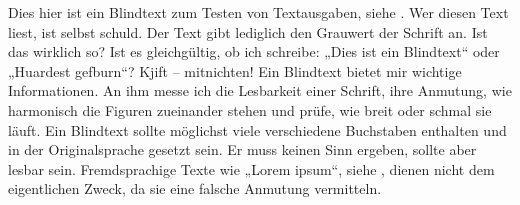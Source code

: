 \documentclass[12pt,ngerman]{scrartcl}
\begin{document}
\blindtext

Dies hier ist ein Blindtext zum Testen von Textausgaben, siehe \cite{Ziegenhagen2023}. Wer diesen Text liest, ist selbst schuld. Der Text gibt lediglich den Grauwert der Schrift an. Ist das wirklich so? Ist es gleichgültig, ob ich schreibe: „Dies ist ein Blindtext“ oder „Huardest gefburn“? Kjift – mitnichten! Ein \cite{Knuth1982} Blindtext bietet mir wichtige Informationen. An ihm messe ich die Lesbarkeit einer Schrift, ihre Anmutung, wie harmonisch die Figuren zueinander stehen und prüfe, wie breit oder schmal sie läuft. Ein Blindtext sollte möglichst viele verschiedene Buchstaben enthalten und in der Originalsprache gesetzt sein. Er muss keinen Sinn ergeben, sollte aber lesbar sein. Fremdsprachige Texte wie „Lorem ipsum“, siehe \cite{Knuth1982}, dienen nicht dem eigentlichen Zweck, da sie eine falsche Anmutung vermitteln.

\printbibliography
\end{document}
